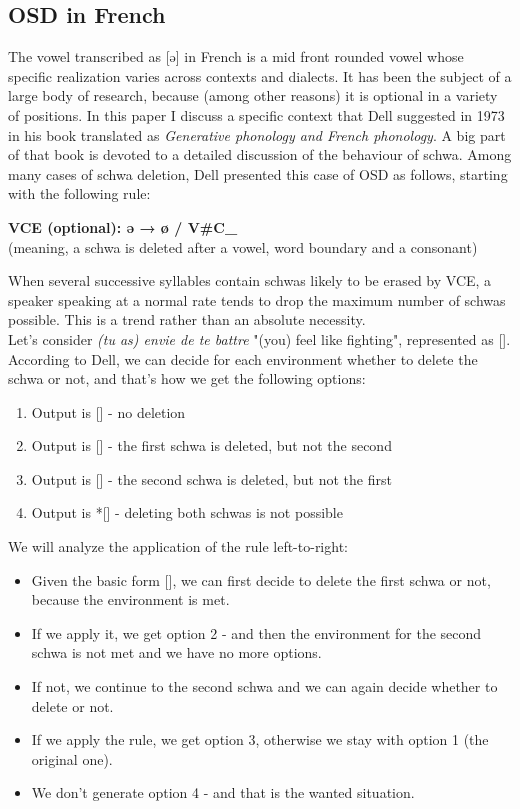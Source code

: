 \documentclass{article}
\begin{document}
\subsection{OSD in French}
The vowel transcribed as [ə] in French is a mid front rounded vowel whose specific realization varies across contexts and dialects.  It has been the subject of a large body of research,  because (among other reasons) it is optional in a variety of positions.  In this paper I discuss a specific context that Dell suggested in 1973 in his book translated as \textit{Generative phonology and French phonology}.  A big part of that book is devoted to a detailed discussion of the behaviour of schwa. Among many cases of schwa deletion, Dell presented this case of OSD as follows, starting with the following rule:\\

\begin{center}
\textbf{VCE (optional): ə → ø / V\#C\_} \\
(meaning, a schwa is deleted after a vowel, word boundary and a consonant)
\end{center}
When several successive syllables contain schwas likely to be erased by VCE, a speaker speaking at a normal rate tends to drop the maximum number of schwas possible.  This is a trend rather than an absolute necessity. \\ 
Let's consider \textit{(tu as) envie de te battre} "(you) feel like fighting",  represented as [].
According to Dell, we can decide for each environment whether to delete the schwa or not, and that's how we get the following options:
\begin{enumerate}
  \item Output is [] - no deletion
  \item Output is [] - the first schwa is deleted, but not the second 
  \item Output is [] - the second schwa is deleted, but not the first 
  \item Output is *[] - deleting both schwas is not possible
\end{enumerate}
We will analyze the application of the rule left-to-right:
\begin{itemize}
  \item Given the basic form [],  we can first decide to delete the first schwa or not, because the environment is met.
  \item If we apply it, we get option 2 - and then the environment for the second schwa is not met and we have no more options.
  \item If not, we continue to the second schwa and we can again decide whether to delete or not.
  \item If we apply the rule, we get option 3, otherwise we stay with option 1 (the original one).
  \item We don't generate option 4 - and that is the wanted situation.
\end{itemize}
\end{document}
